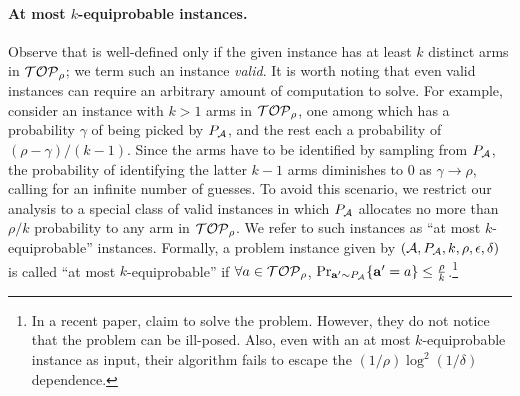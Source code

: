 \paragraph{At most $k$-equiprobable instances.} Observe that \QPK is well-defined only if the given instance has at least $k$ distinct arms in ${\mathcal{TOP}_\rho}$; we term such an instance
\textit{valid}. It is worth noting that even valid instances can require an arbitrary amount of computation
to solve. For example, consider an instance with $k > 1$ arms in ${\mathcal{TOP}_\rho}$, one among which has a probability $\gamma$ of being picked by $P_{\mathcal{A}}$, and the rest each a probability of $(\rho - \gamma) / (k - 1)$. Since the arms have to be identified by sampling from $P_{\mathcal{A}}$, the probability of identifying the latter $k - 1$ arms diminishes to $0$ as $\gamma \to \rho$, calling for an infinite number of guesses. To avoid this scenario, we restrict our analysis to a special class of valid instances in which $P_{\mathcal{A}}$ allocates no more than $\rho/k$ probability to any arm in 
${\mathcal{TOP}_\rho}$. We refer to such instances as ``at most $k$-equiprobable'' instances. Formally,
a \QPK problem instance given by $(\mathcal{A}, P_{\mathcal{A}}, k, \rho, \epsilon, \delta)$ is called
``at most $k$-equiprobable'' if 
$\forall a \in {\mathcal{TOP}_\rho}$, $\Pr_{\mathbf{a}' \sim P_{\mathcal{A}}}\{\mathbf{a}' = a\} \leq \frac{\rho}{k}$.\footnote{In a recent paper, \citet{Ren+LS:2018} claim to solve the \QPK problem. However, they do not notice that the problem can be ill-posed. Also, even with an at most $k$-equiprobable instance as input, their algorithm fails to escape the $(1/\rho)\log^2(1/\delta)$ dependence.}


